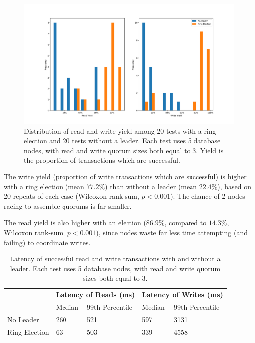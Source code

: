 \documentclass[12pt,a4paper,twoside,openany]{report}
\begin{document}
\begin{figure}[ht]
\centerline{\includegraphics[width=\linewidth]{figs/elector-hist.png}}
\caption[Read and write yield in tests comparing my system with and without a leadership election]{Distribution of read and write yield among 20 tests with a ring election and 20 tests without a leader. Each test uses 5 database nodes, with read and write quorum sizes both equal to 3. Yield is the proportion of transactions which are successful.}
\label{electorhist}
\end{figure}

The write yield (proportion of write transactions which are successful) is higher with a ring election (mean $77.2\%$) than without a leader (mean $22.4\%$), based on 20 repeats of each case (Wilcoxon rank-sum, $p < 0.001$). The chance of 2 nodes racing to assemble quorums is far smaller.

The read yield is also higher with an election ($86.9\%$, compared to $14.3\%$, Wilcoxon rank-sum, $p < 0.001$), since nodes waste far less time attempting (and failing) to coordinate writes.

\begin{table}[ht!]
\centering
\renewcommand{\arraystretch}{1.3}
\begin{tabular}{@{} l l l l l @{}}
\toprule
& \multicolumn{2}{c}{\bf Latency of Reads (ms)} & \multicolumn{2}{c}{\bf Latency of Writes (ms)} \\
\cmidrule(lr){2-3}
\cmidrule(lr){4-5}
& Median & 99th Percentile & Median & 99th Percentile \\
\hline
No Leader & 260 & 521 & 597 & 3131 \\
Ring Election & 63 & 503 & 339 & 4558 \\
\bottomrule
\end{tabular}
\caption[Latency in tests comparing my system with and without a leadership election]{Latency of successful read and write transactions with and without a leader. Each test uses 5 database nodes, with read and write quorum sizes both equal to 3.}
\label{electorlatency}
\end{table}
\end{document}
